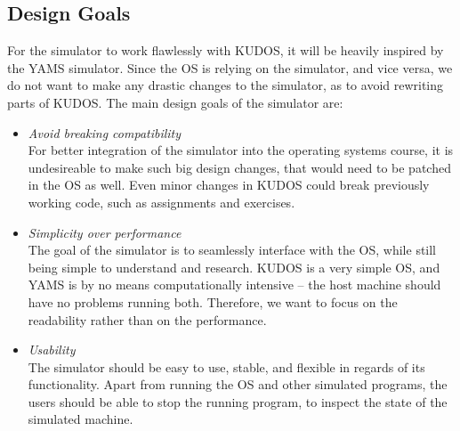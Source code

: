 \subsection{Design Goals}
For the simulator to work flawlessly with KUDOS, it will be heavily inspired by
the YAMS simulator. Since the OS is relying on the simulator, and vice versa,
we do not want to make any drastic changes to the simulator, as to avoid rewriting
parts of KUDOS. The main design goals of the simulator are:\\
\begin{itemize}
\item \textit{Avoid breaking compatibility}\\
For better integration of the simulator into the operating systems course, it is
undesireable to make such big design changes, that would need to be patched in
the OS as well. Even minor changes in KUDOS could break previously working
code, such as assignments and exercises.

\item \textit{Simplicity over performance}\\
The goal of the simulator is to seamlessly interface with the OS, while still
being simple to understand and research. KUDOS is a very simple OS, and YAMS is
by no means computationally intensive -- the host machine should have no problems
running both. Therefore, we want to focus on the readability rather than on the
performance.

\item \textit{Usability}\\
The simulator should be easy to use, stable, and flexible in regards of its
functionality.
Apart from running the OS and other simulated programs, the users should be able
to stop the running program, to inspect the state of the simulated machine.
\end{itemize}
